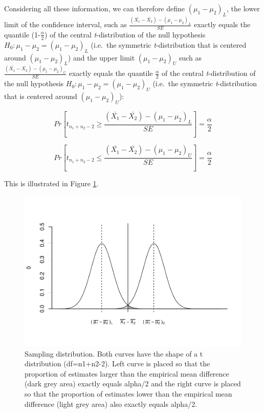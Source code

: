 \documentclass[
  man,floatsintext]{apa6}
\begin{document}
Considering all these information, we can therefore define \((\mu_1-\mu_2)_L\), the lower limit of the confidence interval, such as \(\frac{(\bar{X_1}-\bar{X_2})-(\mu_1-\mu_2)_L}{SE}\) exactly equals the quantile (1-\(\frac{\alpha}{2}\)) of the central \emph{t}-distribution of the null hypothesis \(H_0: \mu_1 - \mu_2 = (\mu_1-\mu_2)_L\) (i.e.~the symmetric \emph{t}-distribution that is centered around \((\mu_1-\mu_2)_L\)) and the upper limit \((\mu_1-\mu_2)_U\) such as \(\frac{(\bar{X_1}-\bar{X_2})-(\mu_1-\mu_2)_U}{SE}\) exactly equals the quantile \(\frac{\alpha}{2}\) of the central \emph{t}-distribution of the null hypothesis \(H_0: \mu_1 - \mu_2 = (\mu_1-\mu_2)_U\) (i.e.~the symmetric \emph{t}-distribution that is centered around \((\mu_1-\mu_2)_U\)):

\begin{equation} 
Pr[t_{n_1+n_2-2} \geq \frac{(\bar{X_1}-\bar{X_2})-(\mu_1-\mu_2)_L}{SE}]= \frac{\alpha}{2}
\label{eq:plausiblelimit1}
\end{equation}

\begin{equation} 
Pr[t_{n_1+n_2-2} \leq \frac{(\bar{X_1}-\bar{X_2})-(\mu_1-\mu_2)_U}{SE}]= \frac{\alpha}{2}
\label{eq:plausiblelimit2}
\end{equation}

This is illustrated in Figure \ref{fig:ILLUSTRATION}.

\begin{figure}
\centering
\includegraphics{CI_files/figure-latex/ILLUSTRATION-1.pdf}
\caption{\label{fig:ILLUSTRATION}Sampling distribution. Both curves have the shape of a t distribution (df=n1+n2-2). Left curve is placed so that the proportion of estimates larger than the empirical mean difference (dark grey area) exactly equals alpha/2 and the right curve is placed so that the proportion of estimates lower than the empirical mean difference (light grey area) also exactly equals alpha/2.}
\end{figure}
\end{document}
